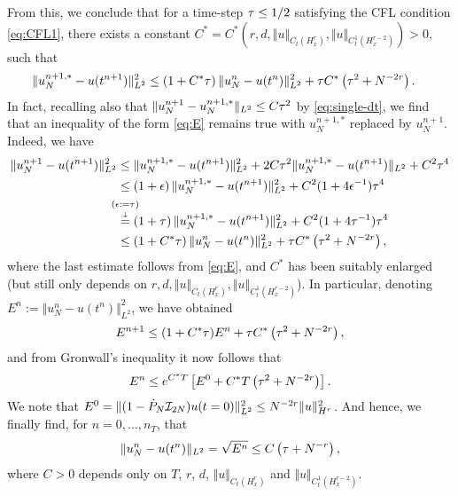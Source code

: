 \documentclass[reqno,a4paper]{amsart}
\begin{document}
From this, we conclude that for a time-step ${\tau} \le 1/2$ satisfying the CFL condition \eqref{eq:CFL1}, there exists a constant $C^\ast = C^\ast(r,d,\Vert u \Vert_{C_t(H^r_x)}, \Vert u \Vert_{C^1_t(H^{r-2}_x)}) > 0$, such that
\begin{align} \label{eq:E}
\begin{aligned}
\Vert u^{n+1,\ast}_N - u(t^{n+1}) \Vert^2_{L^2}
&\le
\left(
1 + C^\ast{\tau}
\right)
\Vert u^{n}_N - u(t^{n}) \Vert^2_{L^2}
 +
{\tau} C^\ast \left( {\tau}^2 + N^{-2r}\right).
\end{aligned}
\end{align}
In fact, recalling also that $\Vert u^{n+1}_N - u^{n+1,\ast}_N \Vert_{L^2} \le C {\tau}^2$ by \eqref{eq:single-dt}, we find that an inequality of the form \eqref{eq:E} remains true with $u^{n+1,\ast}_N$ replaced by $u^{n+1}_N$. Indeed, we have 
\begin{align} 
\begin{aligned}
\Vert u^{n+1}_N - u(t^{n+1}) \Vert^2_{L^2}
&\le
\Vert u^{n+1,\ast}_N - u(t^{n+1}) \Vert^2_{L^2}
+ 2C\dt^2 \Vert u^{n+1,\ast}_N - u(t^{n+1}) \Vert_{L^2}
+
C^2 \dt^4
\\
&\le
\left(1 + \epsilon\right)\Vert u^{n+1,\ast}_N - u(t^{n+1}) \Vert^2_{L^2}
+
C^2(1+4\epsilon^{-1}) \dt^4
\\
&\explain{=}{(\epsilon := \dt)}
\left(1 + \dt\right)\Vert u^{n+1,\ast}_N - u(t^{n+1}) \Vert^2_{L^2}
+
C^2(1+4\dt^{-1}) \dt^4
\\
&\le
\left(
1 + C^\ast\dt
\right)
\Vert u^{n}_N - u(t^{n}) \Vert^2_{L^2}
 +
\dt C^\ast \left( \dt^2 + N^{-2r}\right),
\end{aligned}
\end{align}
where the last estimate follows from \eqref{eq:E}, and $C^\ast$ has been suitably enlarged (but still only depends on $r,d,\Vert u \Vert_{C_t(H^r_x)}, \Vert u \Vert_{C^1_t(H^{r-2}_x)}$). In particular, denoting $E^n := \Vert u^n_N - u(t^n)\Vert_{L^2}^2$, we have obtained
\[
E^{n+1} \le (1+C^\ast {\tau}) E^{n} + {\tau} C^\ast \left( {\tau}^2 + N^{-2r}\right),
\]
and from Gronwall's inequality it now follows that
\[
E^n \le e^{C^\ast T}\left[E^0 + C^\ast T \left( {\tau}^2 + N^{-2r} \right)\right].
\]
We note that $E^0 = \Vert (1-\dot{P}_N\mathcal{I}_{2N}) u(t=0)\Vert^2_{L^2} \le N^{-2r} \Vert u \Vert_{H^r}^2$. And hence, we finally find, for $n=0,\dots, n_T$, that
\begin{align} \label{eq:stability}
\Vert u^n_N - u(t^n) \Vert_{L^2}
= \sqrt{E^n} \le C\left( {\tau} + N^{-r}\right),
\end{align}
where $C>0$ depends only on $T$, $r$, $d$, $\Vert u \Vert_{C_t(H^r_x)}$ and $\Vert u \Vert_{C^1_t(H^{r-2}_x)}$.
\end{document}

